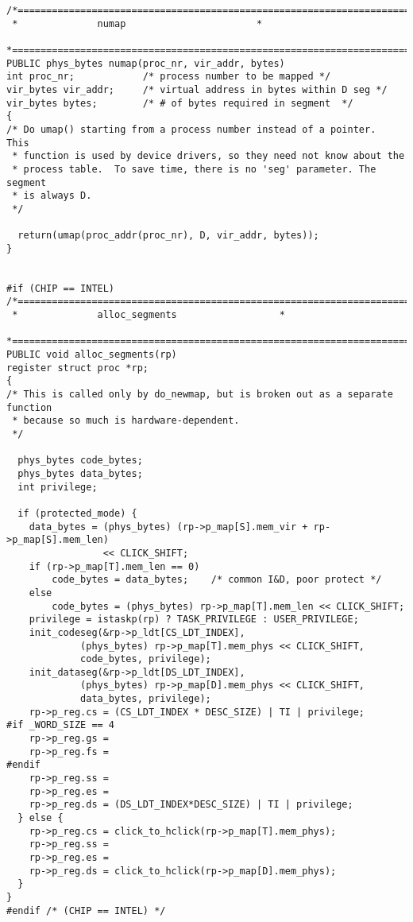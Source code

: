 \begin{verbatim}
/*==========================================================================*
 *				numap					    *
 *==========================================================================*/
PUBLIC phys_bytes numap(proc_nr, vir_addr, bytes)
int proc_nr;			/* process number to be mapped */
vir_bytes vir_addr;		/* virtual address in bytes within D seg */
vir_bytes bytes;		/* # of bytes required in segment  */
{
/* Do umap() starting from a process number instead of a pointer.  This
 * function is used by device drivers, so they need not know about the
 * process table.  To save time, there is no 'seg' parameter. The segment
 * is always D.
 */

  return(umap(proc_addr(proc_nr), D, vir_addr, bytes));
}


#if (CHIP == INTEL)
/*==========================================================================*
 *				alloc_segments				    *
 *==========================================================================*/
PUBLIC void alloc_segments(rp)
register struct proc *rp;
{
/* This is called only by do_newmap, but is broken out as a separate function
 * because so much is hardware-dependent.
 */

  phys_bytes code_bytes;
  phys_bytes data_bytes;
  int privilege;

  if (protected_mode) {
	data_bytes = (phys_bytes) (rp->p_map[S].mem_vir + rp->p_map[S].mem_len)
	             << CLICK_SHIFT;
	if (rp->p_map[T].mem_len == 0)
		code_bytes = data_bytes;	/* common I&D, poor protect */
	else
		code_bytes = (phys_bytes) rp->p_map[T].mem_len << CLICK_SHIFT;
	privilege = istaskp(rp) ? TASK_PRIVILEGE : USER_PRIVILEGE;
	init_codeseg(&rp->p_ldt[CS_LDT_INDEX],
		     (phys_bytes) rp->p_map[T].mem_phys << CLICK_SHIFT,
		     code_bytes, privilege);
	init_dataseg(&rp->p_ldt[DS_LDT_INDEX],
		     (phys_bytes) rp->p_map[D].mem_phys << CLICK_SHIFT,
		     data_bytes, privilege);
	rp->p_reg.cs = (CS_LDT_INDEX * DESC_SIZE) | TI | privilege;
#if _WORD_SIZE == 4
	rp->p_reg.gs =
	rp->p_reg.fs =
#endif
	rp->p_reg.ss =
	rp->p_reg.es =
	rp->p_reg.ds = (DS_LDT_INDEX*DESC_SIZE) | TI | privilege;
  } else {
	rp->p_reg.cs = click_to_hclick(rp->p_map[T].mem_phys);
	rp->p_reg.ss =
	rp->p_reg.es =
	rp->p_reg.ds = click_to_hclick(rp->p_map[D].mem_phys);
  }
}
#endif /* (CHIP == INTEL) */
\end{verbatim}
